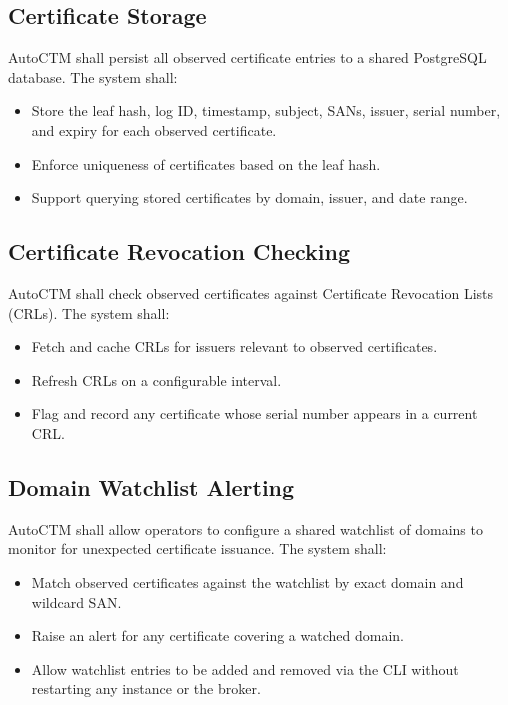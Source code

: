 \documentclass{article}
\begin{document}
\subsection{Certificate Storage}

AutoCTM shall persist all observed certificate entries to a shared PostgreSQL 
database. The system shall:

\begin{itemize}

\item Store the leaf hash, log ID, timestamp, subject, SANs, issuer, serial 
number, and expiry for each observed certificate.

\item Enforce uniqueness of certificates based on the leaf hash.

\item Support querying stored certificates by domain, issuer, and date range.

\end{itemize}

\subsection{Certificate Revocation Checking}

AutoCTM shall check observed certificates against Certificate Revocation 
Lists (CRLs). The system shall:

\begin{itemize}

\item Fetch and cache CRLs for issuers relevant to observed certificates.

\item Refresh CRLs on a configurable interval.

\item Flag and record any certificate whose serial number appears in a 
current CRL.

\end{itemize}

\subsection{Domain Watchlist Alerting}

AutoCTM shall allow operators to configure a shared watchlist of domains to 
monitor for unexpected certificate issuance. The system shall:

\begin{itemize}

\item Match observed certificates against the watchlist by exact domain and 
wildcard SAN.

\item Raise an alert for any certificate covering a watched domain.

\item Allow watchlist entries to be added and removed via the CLI without 
restarting any instance or the broker.

\end{itemize}
\end{document}
